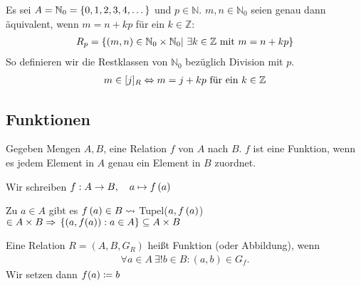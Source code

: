 \begin{beispiel}
    Es sei $A = \mathbb{N}_{0} = \left\{0,1,2,3,4,\dots\right\}$ und $p\in \mathbb{N}$. $m,n\in\mathbb{N}_0$ seien genau dann äquivalent, wenn $m=n+kp$ für ein $k\in\mathbb{Z}$:
    \begin{align*}
        R_{p} = \left\{\left(m,n\right)\in \mathbb{N}_0 \times \mathbb{N}_0 |~\exists k\in \mathbb{Z}\text{ mit } m=n+kp\right\}
    \end{align*}
    So definieren wir die Restklassen von $\mathbb{N}_0$ bezüglich Division mit $p$.
    \begin{align*}
        m\in [j]_{R} \Leftrightarrow{} m=j+kp\text{ für ein }k\in\mathbb{Z}
    \end{align*}
\end{beispiel}


\subsection{Funktionen}

\begin{bemerkung}
    \marginnote{[2. Nov]}
    Gegeben Mengen $A, B$, eine Relation $f$ von $A$ nach $B$. $f$ ist eine Funktion, wenn es jedem Element in $A$ genau ein Element in $B$ zuordnet.
\end{bemerkung}

\begin{notation}[Pfeilnotation]
    Wir schreiben $f: A \rightarrow{} B,\quad a\mapsto f\left(a\right)$
\end{notation}
\begin{folgerung}
    Zu $a\in A$ gibt es $f\left(a\right)\in B \leadsto$ Tupel($a, f\left(a\right)$) $\in A\times B \Rightarrow{} \left\{\left(a, f(a)\right): a\in A\right\} \subseteq A\times B$
\end{folgerung}

\begin{definition}[Funktion]
    Eine Relation $R = (A, B, G_R)$ heißt Funktion (oder Abbildung), wenn
    \begin{align*}
        \forall a\in A~\exists! b\in B: (a,b)\in G_f.
    \end{align*}
    Wir setzen dann $f(a)\coloneqq b$
\end{definition}

